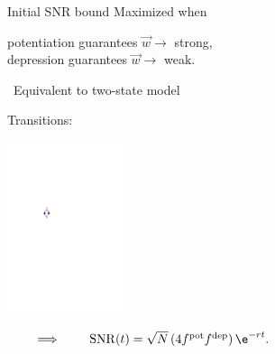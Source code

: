 \documentclass[final,hyperref={pdfpagelabels=false,bookmarks=false}]{beamer}
\DeclareMathOperator{\snr}{SNR}
\newcommand{\pot}{^\text{pot}}
\newcommand{\dep}{^\text{dep}}
\newcommand{\W}{\vec{w}}
\begin{document}
\begin{frame}{}
\begin{columns}[t]
\begin{column}{0.29\linewidth}
\begin{block}{Initial SNR bound}
 \vp
 Maximized when \parbox[t]{0.4\linewidth}{
 potentiation guarantees $\W\to$ strong, \\
 depression guarantees $\W\to$ weak.
 }%
\hspace{2cm}
   \hspace{2cm}

 \vp \lto\ Equivalent to two-state model
  \begin{center}
  Transitions:\hspace{1cm}
   \parbox{2cm}{\includegraphics[height=5cm]{binary_det.svg}}
   $\qquad\implies\qquad\snr(t)=\sqrt{N}\,(4 f\pot f\dep)\,\e^{-rt}.$
  \end{center}


\end{block}
\end{column}
\end{columns}
\end{frame}
\end{document}
